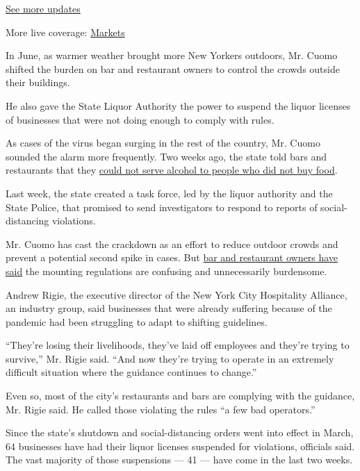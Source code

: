 \href{https://www.nytimes.com/2020/08/01/world/coronavirus-covid-19.html?action=click\&pgtype=Article\&state=default\&region=MAIN_CONTENT_1\&context=storylines_live_updates}{See
more updates}

More live coverage:
\href{https://www.nytimes.com/live/2020/07/31/business/stock-market-today-coronavirus?action=click\&pgtype=Article\&state=default\&region=MAIN_CONTENT_1\&context=storylines_live_updates}{Markets}

In June, as warmer weather brought more New Yorkers outdoors, Mr. Cuomo
shifted the burden on bar and restaurant owners to control the crowds
outside their buildings.

He also gave the State Liquor Authority the power to suspend the liquor
licenses of businesses that were not doing enough to comply with rules.

As cases of the virus began surging in the rest of the country, Mr.
Cuomo sounded the alarm more frequently. Two weeks ago, the state told
bars and restaurants that they
\href{https://www.nytimes.com/2020/07/16/nyregion/ny-bars-open-cuomo.html?module=inline}{could
not serve alcohol to people who did not buy food}.

Last week, the state created a task force, led by the liquor authority
and the State Police, that promised to send investigators to respond to
reports of social-distancing violations.

Mr. Cuomo has cast the crackdown as an effort to reduce outdoor crowds
and prevent a potential second spike in cases. But
\href{https://www.nytimes.com/2020/07/20/nyregion/nyc-phase-4-reopening-bars.html?module=inline}{bar
and restaurant owners have said} the mounting regulations are confusing
and unnecessarily burdensome.

Andrew Rigie, the executive director of the New York City Hospitality
Alliance, an industry group, said businesses that were already suffering
because of the pandemic had been struggling to adapt to shifting
guidelines.

``They're losing their livelihoods, they've laid off employees and
they're trying to survive,'' Mr. Rigie said. ``And now they're trying to
operate in an extremely difficult situation where the guidance continues
to change.''

Even so, most of the city's restaurants and bars are complying with the
guidance, Mr. Rigie said. He called those violating the rules ``a few
bad operators.''

Since the state's shutdown and social-distancing orders went into effect
in March, 64 businesses have had their liquor licenses suspended for
violations, officials said. The vast majority of those suspensions ---
41 --- have come in the last two weeks.

